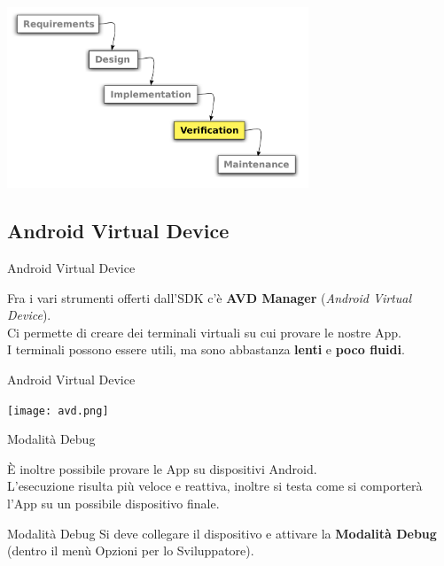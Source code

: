 \documentclass[xcolor=svgnames,11pt]{beamer}
\begin{document}
\begin{frame}
\begin{center}
\includegraphics[width=9cm]{waterfall_4.pdf}
\end{center}
\end{frame}

\subsection{Android Virtual Device}
\begin{frame}{Android Virtual Device}

	Fra i vari strumenti offerti dall'SDK c'\`e \textbf{AVD Manager} (\emph{Android Virtual Device}).\\
	\pause
	\medskip
	Ci permette di creare dei terminali virtuali su cui provare le nostre App.\\
	\pause
	\medskip
	I terminali possono essere utili, ma sono abbastanza \textbf{lenti} e \textbf{poco fluidi}.

\end{frame}
\begin{frame}{Android Virtual Device}

\begin{center}
\texttt{[image: avd.png]}
\end{center}
\end{frame}

\begin{frame}{Modalit\`a Debug}

	\`E inoltre possibile provare le App su dispositivi Android.\\
	\pause
	\medskip
	L'esecuzione risulta pi\`u veloce e reattiva, inoltre si testa come si comporter\`a l'App su un possibile dispositivo finale.\\
	\pause
	\medskip
	\begin{block}{Modalit\`a Debug}
	Si deve collegare il dispositivo e attivare la \textbf{Modalit\`a Debug} (dentro il men\`u Opzioni per lo Sviluppatore).
	\end{block}
\end{frame}
\end{document}
